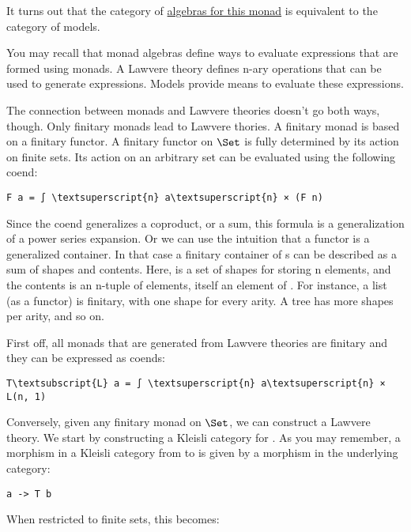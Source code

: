 It turns out that the category of
\hyperref[algebras-for-monads]{algebras
for this monad} is equivalent to the category of models.

You may recall that monad algebras define ways to evaluate expressions
that are formed using monads. A Lawvere theory defines n-ary operations
that can be used to generate expressions. Models provide means to
evaluate these expressions.

The connection between monads and Lawvere theories doesn't go both ways,
though. Only finitary monads lead to Lawvere thories. A finitary monad
is based on a finitary functor. A finitary functor on $\Set$ is
fully determined by its action on finite sets. Its action on an
arbitrary set  can be evaluated using the following coend:

\begin{Verbatim}[commandchars=\\\{\}]
F a = ∫ \textsuperscript{n} a\textsuperscript{n} × (F n)
\end{Verbatim}
Since the coend generalizes a coproduct, or a sum, this formula is a
generalization of a power series expansion. Or we can use the intuition
that a functor is a generalized container. In that case a finitary
container of s can be described as a sum of shapes and
contents. Here,  is a set of shapes for storing n elements,
and the contents is an n-tuple of elements, itself an element of
. For instance, a list (as a functor) is finitary, with one
shape for every arity. A tree has more shapes per arity, and so on.

First off, all monads that are generated from Lawvere theories are
finitary and they can be expressed as coends:

\begin{Verbatim}[commandchars=\\\{\}]
T\textsubscript{L} a = ∫ \textsuperscript{n} a\textsuperscript{n} × L(n, 1)
\end{Verbatim}
Conversely, given any finitary monad  on $\Set$, we can
construct a Lawvere theory. We start by constructing a Kleisli category
for . As you may remember, a morphism in a Kleisli category
from  to  is given by a morphism in the underlying
category:

\begin{Verbatim}[commandchars=\\\{\}]
a -> T b
\end{Verbatim}
When restricted to finite sets, this becomes:

